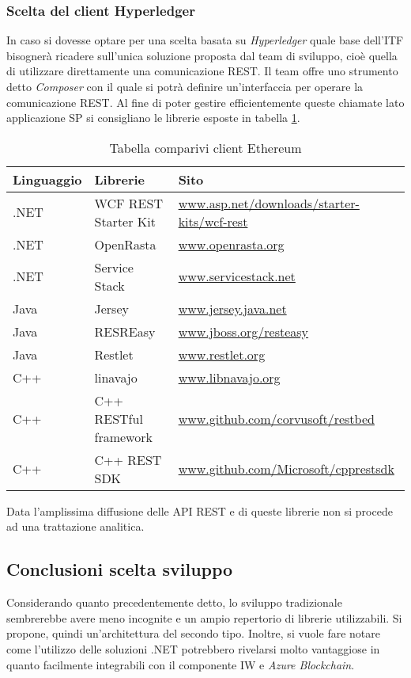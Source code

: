 \subsubsection{Scelta del client Hyperledger}
In caso si dovesse optare per una scelta basata su \emph{Hyperledger} quale base dell’ITF bisognerà ricadere sull’unica soluzione proposta dal team di sviluppo, cioè quella di utilizzare direttamente una comunicazione REST. Il team offre uno strumento detto \emph{Composer} con il quale si potrà definire un’interfaccia per operare la comunicazione REST. Al fine di poter gestire efficientemente queste chiamate lato applicazione SP si consigliano le librerie esposte in tabella \ref{tab:comp-client-hyp}.
\begin{table}[!h] %
    \caption{Tabella comparivi client Ethereum}
    \label{tab:comp-client-hyp}
    \begin{tabularx}{\textwidth}{|X|X|X|}
    \hline
    \textbf{Linguaggio} & \textbf{Librerie} & \textbf{Sito}\\
    \hline
    .NET   & WCF REST Starter Kit  & \url{www.asp.net/downloads/starter-kits/wcf-rest} \\
    \hline
    .NET   & OpenRasta & \url{www.openrasta.org} \\
    \hline
    .NET   & Service Stack  & \url{www.servicestack.net} \\
    \hline
    Java  & Jersey & \url{www.jersey.java.net} \\
    \hline
    Java  & RESREasy & \url{www.jboss.org/resteasy}\\
    \hline
    Java  & Restlet & \url{www.restlet.org}\\
    \hline
    C++  & linavajo & \url{www.libnavajo.org}\\
    \hline
    C++  & C++ RESTful framework & \url{www.github.com/corvusoft/restbed}\\
    \hline
    C++  & C++ REST SDK & \url{www.github.com/Microsoft/cpprestsdk}\\
    \hline
    \end{tabularx}
\end{table}%
Data l’amplissima diffusione delle API REST e di queste librerie non si procede ad una trattazione analitica.
\subsection{Conclusioni scelta sviluppo}
Considerando quanto precedentemente detto, lo sviluppo tradizionale sembrerebbe avere meno incognite e un ampio repertorio di librerie utilizzabili. Si propone, quindi un’architettura del secondo tipo.
Inoltre, si vuole fare notare come l’utilizzo delle soluzioni .NET potrebbero rivelarsi molto vantaggiose in quanto facilmente integrabili con il componente IW e \emph{Azure Blockchain}.
